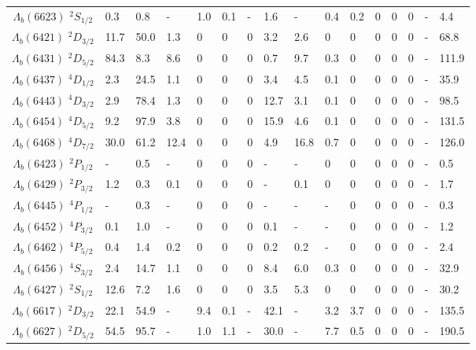 \begin{tabular}{c |  p{0.58cm}  p{0.58cm}  p{0.58cm}  p{0.58cm}  p{0.58cm}  p{0.58cm}  p{0.58cm}  p{0.58cm}  p{0.58cm}  p{0.58cm}  p{0.58cm}  p{0.58cm}  p{0.58cm}  p{0.58cm}p{0.75cm}}
$\Lambda_b(6623)$ $^{2}S_{1/2}$&0.3   &0.8   &-   &1.0   &0.1   &-   &1.6   &-   &0.4   &0.2   &$0$   &$0$   &$0$   &-   &4.4  \\
$\Lambda_b(6421)$ $^{2}D_{3/2}$&11.7   &50.0   &1.3   &$0$   &$0$   &$0$   &3.2   &2.6   &$0$   &$0$   &$0$   &$0$   &$0$   &-   &68.8  \\
$\Lambda_b(6431)$ $^{2}D_{5/2}$&84.3   &8.3   &8.6   &$0$   &$0$   &$0$   &0.7   &9.7   &0.3   &$0$   &$0$   &$0$   &$0$   &-   &111.9  \\
$\Lambda_b(6437)$ $^{4}D_{1/2}$&2.3   &24.5   &1.1   &$0$   &$0$   &$0$   &3.4   &4.5   &0.1   &$0$   &$0$   &$0$   &$0$   &-   &35.9  \\
$\Lambda_b(6443)$ $^{4}D_{3/2}$&2.9   &78.4   &1.3   &$0$   &$0$   &$0$   &12.7   &3.1   &0.1   &$0$   &$0$   &$0$   &$0$   &-   &98.5  \\
$\Lambda_b(6454)$ $^{4}D_{5/2}$&9.2   &97.9   &3.8   &$0$   &$0$   &$0$   &15.9   &4.6   &0.1   &$0$   &$0$   &$0$   &$0$   &-   &131.5  \\
$\Lambda_b(6468)$ $^{4}D_{7/2}$&30.0   &61.2   &12.4   &$0$   &$0$   &$0$   &4.9   &16.8   &0.7   &$0$   &$0$   &$0$   &$0$   &-   &126.0  \\
$\Lambda_b(6423)$ $^{2}P_{1/2}$&-   &0.5   &-   &$0$   &$0$   &$0$   &-   &-   &$0$   &$0$   &$0$   &$0$   &$0$   &-   &0.5  \\
$\Lambda_b(6429)$ $^{2}P_{3/2}$&1.2   &0.3   &0.1   &$0$   &$0$   &$0$   &-   &0.1   &$0$   &$0$   &$0$   &$0$   &$0$   &-   &1.7  \\
$\Lambda_b(6445)$ $^{4}P_{1/2}$&-   &0.3   &-   &$0$   &$0$   &$0$   &-   &-   &-   &$0$   &$0$   &$0$   &$0$   &-   &0.3  \\
$\Lambda_b(6452)$ $^{4}P_{3/2}$&0.1   &1.0   &-   &$0$   &$0$   &$0$   &0.1   &-   &-   &$0$   &$0$   &$0$   &$0$   &-   &1.2  \\
$\Lambda_b(6462)$ $^{4}P_{5/2}$&0.4   &1.4   &0.2   &$0$   &$0$   &$0$   &0.2   &0.2   &-   &$0$   &$0$   &$0$   &$0$   &-   &2.4  \\
$\Lambda_b(6456)$ $^{4}S_{3/2}$&2.4   &14.7   &1.1   &$0$   &$0$   &$0$   &8.4   &6.0   &0.3   &$0$   &$0$   &$0$   &$0$   &-   &32.9  \\
$\Lambda_b(6427)$ $^{2}S_{1/2}$&12.6   &7.2   &1.6   &$0$   &$0$   &$0$   &3.5   &5.3   &$0$   &$0$   &$0$   &$0$   &$0$   &-   &30.2  \\
$\Lambda_b(6617)$ $^{2}D_{3/2}$&22.1   &54.9   &-   &9.4   &0.1   &-   &42.1   &-   &3.2   &3.7   &$0$   &$0$   &$0$   &-   &135.5  \\
$\Lambda_b(6627)$ $^{2}D_{5/2}$&54.5   &95.7   &-   &1.0   &1.1   &-   &30.0   &-   &7.7   &0.5   &$0$   &$0$   &$0$   &-   &190.5  \\
\hline \hline
\end{tabular}
